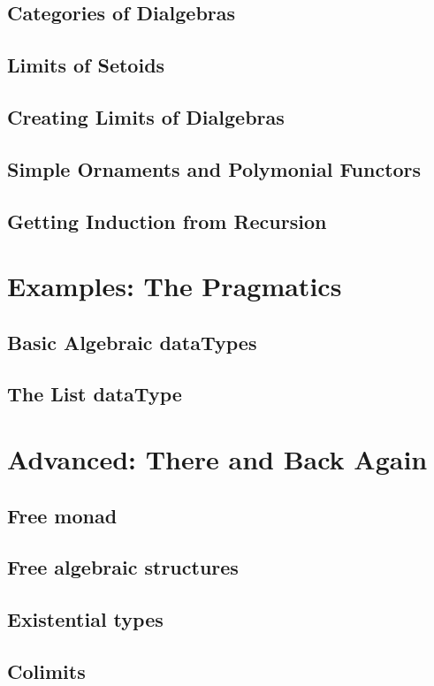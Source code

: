 \documentclass[11pt,oneside]{article}
\begin{document}
\subsection{Categories of Dialgebras}
\subsection{Limits of Setoids}
\subsection{Creating Limits of Dialgebras}
\subsection{Simple Ornaments and Polymonial Functors}
\subsection{Getting Induction from Recursion}

\section{Examples: The Pragmatics}
\subsection{Basic Algebraic dataTypes}
\subsection{The List dataType}

\section{Advanced: There and Back Again}
\subsection{Free monad}
\subsection{Free algebraic structures}
\subsection{Existential types}
\subsection{Colimits}
\end{document}
